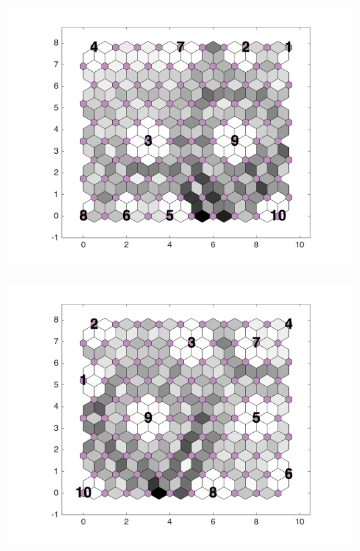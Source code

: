 \begin{figure}
\begin{subfigure}[b]{0.3\textwidth}
        \centering
        \includegraphics[width=\textwidth]{../../images0.01/M31/2D/diff_dimension/combine_2D_data_between_cols3and13.png}
        \label{fig: col3and13_dist}
    \end{subfigure}
        \hfill
    \begin{subfigure}[b]{0.3\textwidth}
        \centering
        \includegraphics[width=\textwidth]{../../images0.01/M31/2D/diff_dimension/combine_2D_data_between_cols3and14.png}
        \label{fig: col3and14_dist}
    \end{subfigure}
        \hfill
    \begin{subfigure}[b]{0.3\textwidth}
        \centering

\end{subfigure}
\end{figure}
